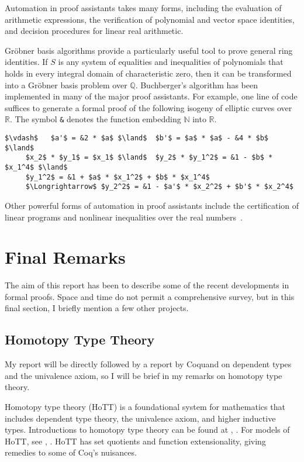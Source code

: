 \documentclass[brochure,english,12pt]{bourbaki}
\theoremstyle{plain}
\def\ring#1{{\mathbb{#1}}}
\begin{document}
Automation in proof assistants takes many forms, including the
evaluation of arithmetic expressions, the verification of polynomial and
vector space identities, and decision procedures for linear real
arithmetic.  

Gr\"obner basis algorithms provide a particularly useful tool to prove
general ring identities. If $S$ is any system of equalities and
inequalities of polynomials that holds in every integral domain of
characteristic zero, then it can be transformed into a Gr\"obner basis
problem over $\ring{Q}$.  Buchberger's algorithm has been
implemented in many of the major proof assistants.  For example, one
line of code suffices to generate a formal proof of the following isogeny of
elliptic curves over $\ring{R}$.  The symbol \verb!&! denotes the function
embedding $\ring{N}$ into $\ring{R}$.

\begin{lstlisting}[keepspaces=true,stringstyle=\tt,basicstyle=\small,frame=single,framesep=8pt,mathescape,morekeywords={None},columns=flexible]
 $\vdash$   $a'$ = &2 * $a$ $\land$  $b'$ = $a$ * $a$ - &4 * $b$ $\land$ 
     $x_2$ * $y_1$ = $x_1$ $\land$  $y_2$ * $y_1^2$ = &1 - $b$ * $x_1^4$ $\land$
     $y_1^2$ = &1 + $a$ * $x_1^2$ + $b$ * $x_1^4$ 
     $\Longrightarrow$ $y_2^2$ = &1 - $a'$ * $x_2^2$ + $b'$ * $x_2^4$
\end{lstlisting}

Other powerful forms of automation in
proof assistants include the certification of linear programs and
nonlinear inequalities over the real numbers~\cite{Solovyev-thesis}.


\section{Final Remarks}

The aim of this report has been to describe some of the recent
developments in formal proofs.  Space and time do not permit a
comprehensive survey, but in this final section, I briefly mention a
few other projects.


\subsection{Homotopy Type Theory}

My report will be directly followed by a report by Coquand on
dependent types and the univalence axiom, so I will be brief in my
remarks on homotopy type theory.

Homotopy type theory (HoTT) is a foundational system for mathematics
that includes dependent type theory, the univalence axiom, and higher
inductive types.  Introductions to homotopy type theory can be found
at \cite{hottbook}, \cite{pelayo2012homotopy}.  For models of HoTT,
see \cite{awodey2007homotopy}, \cite{kapulkin2012simplicial}.  HoTT
has set quotients and function extensionality, giving remedies to some
of Coq's nuisances.
\end{document}
